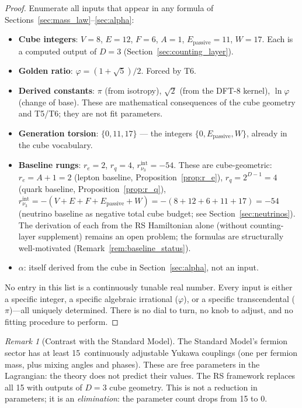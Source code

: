\documentclass[11pt,a4paper]{article}
\theoremstyle{definition}
\theoremstyle{remark}
\newtheorem{remark}[theorem]{Remark}
\newcommand{\phig}{\varphi}
\newcommand{\Epass}{E_{\mathrm{passive}}}
\begin{document}
\begin{proof}
Enumerate all inputs that appear in any formula of
Sections~\ref{sec:mass_law}--\ref{sec:alpha}:

\begin{itemize}[nosep]
  \item \textbf{Cube integers}: $V = 8$, $E = 12$, $F = 6$, $A = 1$,
    $\Epass = 11$, $W = 17$.  Each is a computed output of $D = 3$
    (Section~\ref{sec:counting_layer}).

  \item \textbf{Golden ratio}: $\phig = (1+\sqrt{5})/2$.  Forced by T6.

  \item \textbf{Derived constants}: $\pi$ (from isotropy), $\sqrt{2}$ (from
    the DFT-8 kernel), $\ln\phig$ (change of base).  These are mathematical
    consequences of the cube geometry and T5/T6; they are not fit parameters.

  \item \textbf{Generation torsion}: $\{0, 11, 17\}$ --- the integers
    $\{0, \Epass, W\}$, already in the cube vocabulary.

  \item \textbf{Baseline rungs}: $r_e = 2$, $r_q = 4$, $r_{\nu_3}^{\mathrm{int}}
    = -54$.  These are cube-geometric: $r_e = A + 1 = 2$ (lepton baseline,
    Proposition~\ref{prop:r_e}), $r_q = 2^{D-1} = 4$ (quark baseline,
    Proposition~\ref{prop:r_q}), $r_{\nu_3}^{\mathrm{int}} =
    -(V + E + F + \Epass + W) = -(8 + 12 + 6 + 11 + 17) = -54$
    (neutrino baseline as negative total cube budget;
    see Section~\ref{sec:neutrinos}).  The derivation of each from the RS
    Hamiltonian alone (without counting-layer supplement) remains an open
    problem; the formulas are structurally well-motivated
    (Remark~\ref{rem:baseline_status}).

  \item \textbf{$\alpha$}: itself derived from the cube in
    Section~\ref{sec:alpha}, not an input.
\end{itemize}

\noindent
No entry in this list is a continuously tunable real number.  Every input
is either a specific integer, a specific algebraic irrational ($\phig$), or
a specific transcendental ($\pi$)---all uniquely determined.  There is
no dial to turn, no knob to adjust, and no fitting procedure to perform.
\end{proof}

\begin{remark}[Contrast with the Standard Model]
The Standard Model's fermion sector has at least 15~continuously adjustable
Yukawa couplings (one per fermion mass, plus mixing angles and phases).
These are free parameters in the Lagrangian: the theory does not predict
their values.  The RS framework replaces all 15 with outputs of $D = 3$
cube geometry.  This is not a reduction in parameters; it is an
\emph{elimination}: the parameter count drops from 15 to 0.
\end{remark}
\end{document}
